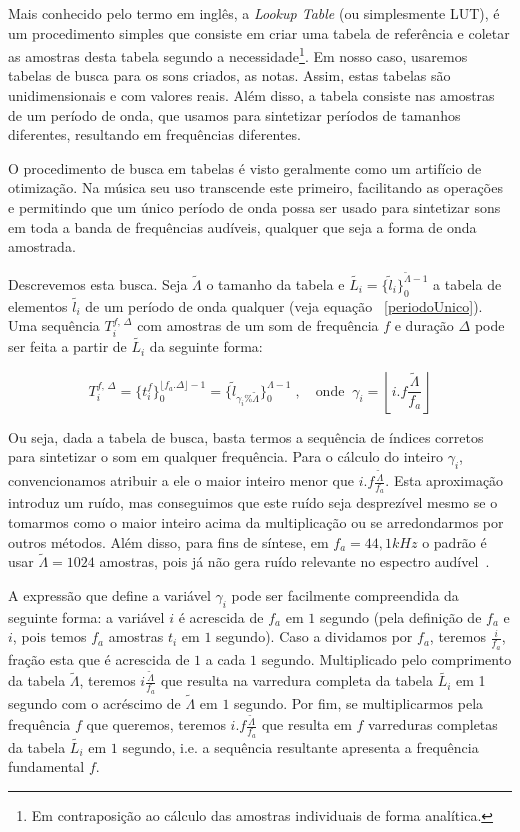 Mais conhecido pelo termo em inglês, a \emph{Lookup Table} (ou simplesmente
LUT), é um procedimento simples que consiste em criar uma tabela
de referência e coletar as amostras desta tabela segundo a 
necessidade\footnote{Em contraposição ao cálculo das amostras individuais
de forma analítica.}. Em nosso caso, usaremos tabelas de busca para os
sons criados, as notas. Assim, estas tabelas são unidimensionais e com
valores reais. Além disso, a tabela consiste nas amostras
de um período de onda, que usamos para sintetizar períodos
de tamanhos diferentes, resultando em frequências diferentes.

O procedimento de busca em tabelas é visto geralmente como um
artifício de otimização. Na música seu uso transcende este
primeiro, facilitando as operações e permitindo que um único
período de onda possa ser usado para sintetizar sons em toda a banda
de frequências audíveis, qualquer que seja a forma de onda amostrada.

Descrevemos esta busca. Seja $\widetilde{\Lambda}$ o tamanho 
da tabela e $\widetilde{L_i} = \{ \widetilde{l}_i \}_0^{\widetilde{\Lambda} -1}$ a tabela de elementos $\widetilde{l_i}$ de um
período de onda qualquer (veja equação ~\ref{periodoUnico}). Uma sequência
$T_i^{f,\,\Delta}$ com amostras de um som de frequência $f$ e duração $\Delta$
pode ser feita a partir de $\widetilde{L_i}$ da seguinte forma:

\begin{equation}
T_i^{f,\,\Delta}=\{t_i^f\}_0^{\lfloor f_a . \Delta \rfloor -1} = \{ \widetilde{l}_{\gamma_i \% \widetilde{\Lambda} } \}_{0}^{\Lambda-1}\; , \quad \text{onde} \;\; \gamma_i = \left \lfloor i . f \frac{ \widetilde{\Lambda}}{f_a} \right \rfloor  
\end{equation}

Ou seja, dada a tabela de busca, basta termos a sequência de índices corretos
para sintetizar o som em qualquer frequência. Para o cálculo do inteiro $\gamma_i$, convencionamos
atribuir a ele o maior inteiro menor que $i.f\frac{\widetilde{\Lambda}}{f_a}$.
Esta aproximação introduz um ruído, mas conseguimos que este ruído seja desprezível
mesmo se o tomarmos como o maior inteiro acima da multiplicação
ou se arredondarmos por outros métodos. Além disso, para fins de síntese, em $f_a=44,1 kHz$
 o padrão é usar $\widetilde{\Lambda} = 1024$ amostras, pois já não gera ruído
 relevante no espectro audível~\cite{Geiger}.

 A expressão que define a variável $\gamma_i$ pode ser facilmente compreendida da
 seguinte forma: a variável $i$ é acrescida de $f_a$ em $1$ segundo (pela
 definição de $f_a$ e $i$, pois temos $f_a$ amostras $t_i$ em $1$ segundo). Caso a dividamos por $f_a$, teremos $\frac{i}{f_a}$,
fração esta que é acrescida de $1$ a cada $1$ segundo. Multiplicado pelo comprimento da
 tabela $\widetilde{\Lambda}$, teremos $i \frac{\widetilde{\Lambda}}{f_a}$
 que resulta na varredura completa da tabela $\widetilde{L_i}$ em 
 1 segundo com o acréscimo de $\widetilde{\Lambda}$ em $1$ segundo. Por fim,
 se multiplicarmos pela frequência $f$ que queremos, teremos $i . f \frac{\widetilde{\Lambda}}{f_a}$
 que resulta em $f$ varreduras completas da tabela $\widetilde{L_i}$ em $1$ segundo, i.e. a sequência
 resultante apresenta a frequência fundamental $f$.

